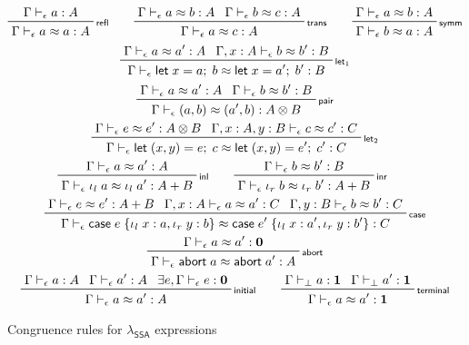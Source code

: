 \documentclass[acmsmall,screen,review]{acmart}
\newcommand{\mb}[1]{\ensuremath{\mathbf{#1}}}
\newcommand{\ms}[1]{\ensuremath{\mathsf{#1}}}
\newcommand{\lto}{:}
\newcommand{\linl}[1]{\iota_l\;{#1}}
\newcommand{\linr}[1]{\iota_r\;{#1}}
\newcommand{\labort}[1]{\ms{abort}\;{#1}}
\newcommand{\letexpr}[3]{\ensuremath{\ms{let}\;#1 = #2;\;#3}}
\newcommand{\caseexpr}[5]{\ms{case}\;#1\;\{\linl{#2} \lto #3, \linr{#4} \lto #5\}}
\newcommand{\bhyp}[2]{#1 : #2}
\newcommand{\rle}[1]{{\scriptsize\textsf{#1}}}
\newcommand{\hasty}[4]{#1 \vdash_{#2} #3: {#4}}
\newcommand{\teqv}{\approx}
\newcommand{\tmeq}[5]{#1 \vdash_{#2} #3 \teqv #4 : {#5}}
\newcommand{\isotopessa}{\(\lambda_{\ms{SSA}}\)}
\begin{document}
\begin{figure}
  \begin{gather*}
    \prftree[r]{\rle{refl}}{\hasty{\Gamma}{\epsilon}{a}{A}}{\tmeq{\Gamma}{\epsilon}{a}{a}{A}} \qquad
    \prftree[r]{\rle{trans}}
      {\tmeq{\Gamma}{\epsilon}{a}{b}{A}}
      {\tmeq{\Gamma}{\epsilon}{b}{c}{A}} 
      {\tmeq{\Gamma}{\epsilon}{a}{c}{A}} \qquad
    \prftree[r]{\rle{symm}}
      {\tmeq{\Gamma}{\epsilon}{a}{b}{A}}
      {\tmeq{\Gamma}{\epsilon}{b}{a}{A}}
    \\
    \prftree[r]{\rle{let$_1$}}
      {\tmeq{\Gamma}{\epsilon}{a}{a'}{A}}
      {\tmeq{\Gamma, \bhyp{x}{A}}{\epsilon}{b}{b'}{B}}
      {\tmeq{\Gamma}{\epsilon}{\letexpr{x}{a}{b}}{\letexpr{x}{a'}{b'}}{B}} 
    \\
    \prftree[r]{\rle{pair}}
      {\tmeq{\Gamma}{\epsilon}{a}{a'}{A}}
      {\tmeq{\Gamma}{\epsilon}{b}{b'}{B}}
      {\tmeq{\Gamma}{\epsilon}{(a, b)}{(a', b)}{A \otimes B}}
    \\
    \prftree[r]{\rle{let$_2$}}
      {\tmeq{\Gamma}{\epsilon}{e}{e'}{A \otimes B}}
      {\tmeq{\Gamma, \bhyp{x}{A}, \bhyp{y}{B}}{\epsilon}{c}{c'}{C}}
      {\tmeq{\Gamma}{\epsilon}{\letexpr{(x, y)}{e}{c}}{\letexpr{(x, y)}{e'}{c'}}{C}}
    \\
    \prftree[r]{\rle{inl}}
      {\tmeq{\Gamma}{\epsilon}{a}{a'}{A}}
      {\tmeq{\Gamma}{\epsilon}{\linl{a}}{\linl{a'}}{A + B}} \qquad
    \prftree[r]{\rle{inr}}
      {\tmeq{\Gamma}{\epsilon}{b}{b'}{B}}
      {\tmeq{\Gamma}{\epsilon}{\linr{b}}{\linr{b'}}{A + B}} \qquad
    \\
    \prftree[r]{\rle{case}}
      {\tmeq{\Gamma}{\epsilon}{e}{e'}{A + B}}
      {\tmeq{\Gamma, \bhyp{x}{A}}{\epsilon}{a}{a'}{C}}
      {\tmeq{\Gamma, \bhyp{y}{B}}{\epsilon}{b}{b'}{C}}
      {\tmeq{\Gamma}{\epsilon}{\caseexpr{e}{x}{a}{y}{b}}{\caseexpr{e'}{x}{a'}{y}{b'}}{C}}
    \\
    \prftree[r]{\rle{abort}}
      {\tmeq{\Gamma}{\epsilon}{a}{a'}{\mb{0}}}
      {\tmeq{\Gamma}{\epsilon}{\labort{a}}{\labort{a'}}{A}}
    \\
    \prftree[r]{\rle{initial}} 
      {\hasty{\Gamma}{\epsilon}{a}{A}}
      {\hasty{\Gamma}{\epsilon}{a'}{A}}
      {\exists e, \hasty{\Gamma}{\epsilon}{e}{\mb{0}}}
      {\tmeq{\Gamma}{\epsilon}{a}{a'}{A}}
      \qquad
    \prftree[r]{\rle{terminal}}
      {\hasty{\Gamma}{\bot}{a}{\mb{1}}}
      {\hasty{\Gamma}{\bot}{a'}{\mb{1}}}
      {\tmeq{\Gamma}{\epsilon}{a}{a'}{\mb{1}}}
    \end{gather*}
  \caption{Congruence rules for \isotopessa{} expressions}
  \Description{}
  \label{fig:ssa-expr-congr-rules}
\end{figure}
\end{document}
